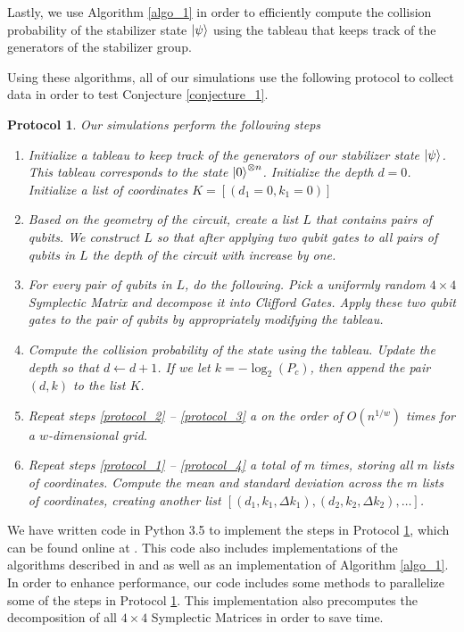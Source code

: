 \message{ !name(report_1.tex)}\documentclass[11pt]{article}
\newtheorem{proto}{Protocol}
\theoremstyle{definition}
\theoremstyle{plain}
\begin{document}
Lastly, we use Algorithm {\ref{algo_1}} in order to efficiently compute the collision probability of the stabilizer state $\ket{\psi}$ using the tableau that keeps track of the generators of the stabilizer group.

Using these algorithms, all of our simulations use the following protocol to collect data in order to test Conjecture {\ref{conjecture_1}}. \\
\begin{proto}\label{proto_1} Our simulations perform the following steps 
  \begin{enumerate}[label = (\arabic*)]
  \item\label{protocol_1}
    Initialize a tableau to keep track of the generators of our stabilizer state $\ket{\psi}$. This tableau corresponds to the state $\ket{0}^{\otimes n }$. Initialize the depth $d = 0$. Initialize a list of coordinates $K = [(d_1 = 0, k_1 = 0)]$ 
  \item\label{protocol_2}
    Based on the geometry of the circuit, create a list $L$ that contains pairs of qubits. We construct $L$ so that after applying two qubit gates to all pairs of qubits in $L$ the depth of the circuit with increase by one. 
  \item For every pair of qubits in $L$, do the following. Pick a uniformly random $4 \times 4$ Symplectic Matrix and decompose it into Clifford Gates. Apply these two qubit gates to the pair of qubits by appropriately modifying the tableau.
  \item\label{protocol_3}
    Compute the collision probability of the state using the tableau. Update the depth so that $d \leftarrow d + 1$. If we let $k = -\log_2 (P_c)$, then append the pair $(d, k)$ to the list $K$. 
  \item\label{protocol_4}
    Repeat steps {\ref{protocol_2}} {--} {\ref{protocol_3}} a on the order of $O(n^{1/w})$ times for a $w$-dimensional grid.
  \item Repeat steps {\ref{protocol_1}} {--} {\ref{protocol_4}} a total of $m$ times, storing all $m$ lists of coordinates. Compute the mean and standard deviation across the $m$ lists of coordinates, creating another list $[(d_1, k_1, \Delta k_1), (d_2, k_2, \Delta k_2), \ldots ]$. 
  \end{enumerate}
\end{proto}

We have written code in Python 3.5 to implement the steps in Protocol {\ref{proto_1}}, which can be found online at {\cite{matthewkhoury96}}. This code also includes implementations of the algorithms described in {\cite{aaronson}} and {\cite{random_clifford}} as well as an implementation of Algorithm {\ref{algo_1}}. In order to enhance performance, our code includes some methods to parallelize some of the steps in Protocol {\ref{proto_1}}. This implementation also precomputes the decomposition of all $4 \times 4$ Symplectic Matrices in order to save time.
\end{document}
